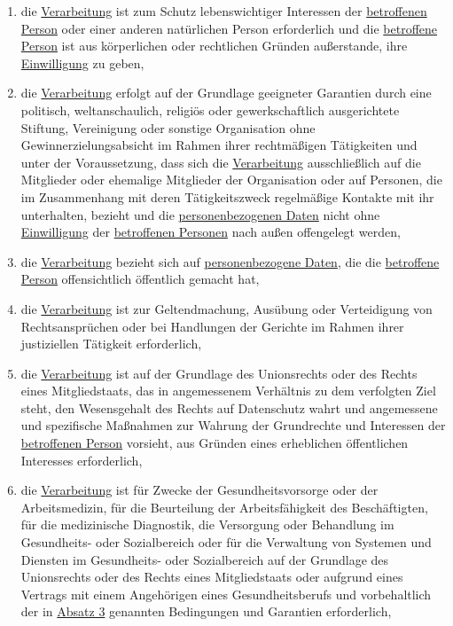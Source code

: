 \begin{enumerate}
\begin{enumerate}
    \item die \hyperref[itm:04-2]{Verarbeitung} ist zum Schutz lebenswichtiger Interessen der \hyperref[itm:04-1]
     {betroffenen Person} oder einer anderen natürlichen Person erforderlich und die \hyperref[itm:04-1]
     {betroffene Person} ist aus körperlichen oder rechtlichen Gründen außerstande, ihre \hyperref[itm:04-11]
     {Einwilligung} zu geben,%
    \label{itm:09-2c}

    \item die \hyperref[itm:04-2]{Verarbeitung} erfolgt auf der Grundlage geeigneter Garantien durch eine politisch,
     weltanschaulich, religiös oder gewerkschaftlich ausgerichtete Stiftung, Vereinigung oder sonstige Organisation
     ohne Gewinnerzielungsabsicht im Rahmen ihrer rechtmäßigen Tätigkeiten und unter der Voraussetzung, dass sich die
     \hyperref[itm:04-2]{Verarbeitung} ausschließlich auf die Mitglieder oder ehemalige Mitglieder der Organisation oder
      auf Personen, die im Zusammenhang mit deren Tätigkeitszweck regelmäßige Kontakte mit ihr unterhalten, bezieht und
      die
     \hyperref[itm:04-1]{personenbezogenen Daten} nicht ohne \hyperref[itm:04-11]{Einwilligung} der \hyperref[itm:04-1]
      {betroffenen Personen} nach außen offengelegt werden,%
    \label{itm:09-2d}

    \item die \hyperref[itm:04-2]{Verarbeitung} bezieht sich auf \hyperref[itm:04-1]{personenbezogene Daten}, die
     die \hyperref[itm:04-1]{betroffene Person} offensichtlich öffentlich gemacht hat,%
    \label{itm:09-2e}

    \item die \hyperref[itm:04-2]{Verarbeitung} ist zur Geltendmachung, Ausübung oder Verteidigung von Rechtsansprüchen
     oder bei Handlungen der Gerichte im Rahmen ihrer justiziellen Tätigkeit erforderlich,%
    \label{itm:09-2f}

    \item die \hyperref[itm:04-2]{Verarbeitung} ist auf der Grundlage des Unionsrechts oder des Rechts eines
     Mitgliedstaats, das in angemessenem Verhältnis zu dem verfolgten Ziel steht, den Wesensgehalt des Rechts auf
     Datenschutz wahrt und angemessene und spezifische Maßnahmen zur Wahrung der Grundrechte und Interessen
     der \hyperref[itm:04-1]{betroffenen Person} vorsieht, aus Gründen eines erheblichen öffentlichen Interesses
     erforderlich,%
    \label{itm:09-2g}

    \item die \hyperref[itm:04-2]{Verarbeitung} ist für Zwecke der Gesundheitsvorsorge oder der Arbeitsmedizin, für die
     Beurteilung der Arbeitsfähigkeit des Beschäftigten, für die medizinische Diagnostik, die Versorgung oder
     Behandlung im Gesundheits- oder Sozialbereich oder für die Verwaltung von Systemen und Diensten im Gesundheits-
     oder Sozialbereich auf der Grundlage des Unionsrechts oder des Rechts eines Mitgliedstaats oder aufgrund eines
     Vertrags mit einem Angehörigen eines Gesundheitsberufs und vorbehaltlich der in \hyperref[itm:09-3]{Absatz 3}
     genannten Bedingungen und Garantien erforderlich,%
    \label{itm:09-2h}


\end{enumerate}
\end{enumerate}
